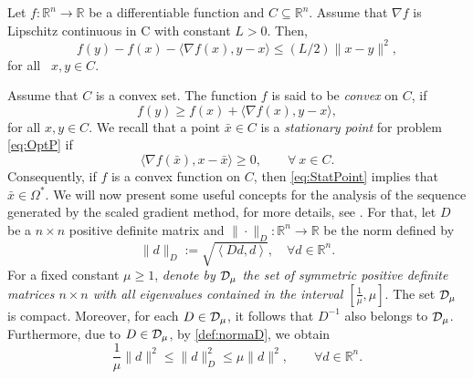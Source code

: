 \begin{lemma} \label{Le:derivlipsch}
	Let $f:\mathbb{R}^n \to \mathbb{R}$ be a differentiable function and $C \subseteq \mathbb{R}^n$. Assume that $\nabla f$  is Lipschitz continuous in C with constant $L>0$. Then,
	\[
		f(y) - f(x) - \langle \nabla f(x), y-x \rangle \leq (L/2)\|x-y\|^2,
	\]
	for all~ $x, y\in C$.
\end{lemma}
Assume that $C$ is a convex set. The function $f$ is said to be \textit{convex} on $C$, if
\[
	f(y) \geq  f(x) + \langle \nabla f(x), y-x \rangle,
\]
for all $x, y\in C$. We recall  that a point ${\bar{x}} \in C$ is a {\it stationary point} for problem \eqref{eq:OptP} if
\begin{equation} \label{eq:StatPoint}
	\langle \nabla f({\bar{x}}),  x-{\bar{x}}\rangle \geq 0, \qquad \forall ~ x\in  C.
\end{equation}
Consequently, if $f$ is a convex funct{}ion  on $C$, then  \eqref{eq:StatPoint} implies that  $\bar{x} \in \Omega^*$.  We will now present some useful concepts  for the analysis of the sequence generated by the scaled  gradient method, for more details, see \cite{CombettesVu2013}.    For that,  let  $D$ be a $n\times n$ positive definite matrix and $\| \cdot \|_{D} : \mathbb{R}^{n}\rightarrow \mathbb{R}$ be  the norm  defined by
\begin{equation} \label{def:normaD}
	\|d\|_{D}:=\sqrt{\left\langle D d,d\right\rangle},\quad \forall d\in \mathbb{R}^{n}.
\end{equation}
For a fixed  constant $\mu \geq 1$,  {\it denote by  ${\cal D}_{\mu}$  the set of symmetric positive definite matrices $n\times n$ with all eigenvalues contained in the interval $[\frac{1}{\mu}, \mu]$}.  The set ${\cal D}_{\mu}$   is compact. Moreover,  for each $D\in {\cal D}_{\mu}$, it follows that $D^{-1}$ also belongs to $ {\cal D}_{\mu}$. Furthermore,  due to $D\in {\cal D}_{\mu}$,  by \eqref{def:normaD}, we obtain
\begin{equation} \label{eq:pnv}
	\frac{1}{\mu}\|d\|^2\leq \|d\|^2_{D}\leq \mu \|d\|^2, \qquad \forall d\in \mathbb{R}^n.
\end{equation}

